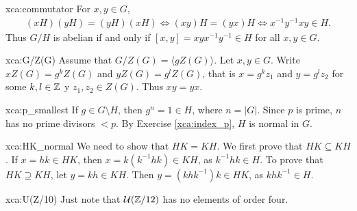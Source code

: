 \begin{sol}{xca:commutator}
For $x,y\in G$,
\begin{align*}
    (xH)(yH)=(yH)(xH) \Longleftrightarrow (xy)H=(yx)H \Longleftrightarrow x^{-1}y^{-1}xy\in H.
\end{align*}
Thus $G/H$ is abelian if and only if  $[x,y]=xyx^{-1}y^{-1}\in H$ for all $x,y\in G$.
\end{sol}


\begin{sol}{xca:G/Z(G)}
Assume that $G/Z(G)=\langle gZ(G)\rangle$. Let $x,y\in G$. 
Write $xZ(G)=g^kZ(G)$ and $yZ(G)=g^lZ(G)$, 
that is 
$x=g^kz_1$ and $y=g^lz_2$ for some $k,l\in\mathbb{Z}$ y $z_1,z_2\in Z(G)$. Thus $xy=yx$.
\end{sol}



\begin{sol}{xca:p_smallest}
    If $g\in G\setminus H$, then $g^n=1\in H$, where $n=|G|$. Since $p$ is prime, $n$ has no prime divisors $<p$. By Exercise \ref{xca:index_p}, $H$ is normal in $G$.
\end{sol}

\begin{sol}{xca:HK_normal}
We need to show that $HK=KH$. We first prove that
$HK\subseteq KH$. If $x=hk\in HK$, then
 $x=k(k^{-1}hk)\in KH$, as $k^{-1}hk\in H$. To prove 
that $HK\supseteq KH$, let $y=kh\in KH$. Then $y=(khk^{-1})k\in HK$, as  $khk^{-1}\in H$. 
\end{sol}

\begin{sol}{xca:U(Z/10)}
Just note that $\mathcal{U}(\mathbb{Z}/12)$ has no elements of order four.
\end{sol}